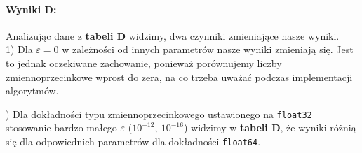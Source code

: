 \documentclass[12pt]{article}
\begin{document}
\paragraph{Wyniki D:}
Analizując dane z \textbf{tabeli D} widzimy, dwa czynniki zmieniające nasze wyniki. \\
1) Dla $\varepsilon = 0$ w zależności od innych parametrów nasze wyniki zmieniają się. Jest to jednak oczekiwane zachowanie, ponieważ porównujemy liczby zmiennoprzecinkowe wprost do zera, na co trzeba uważać podczas implementacji algorytmów.

\mbox{}) Dla dokładności typu zmiennoprzecinkowego ustawionego na \verb*|float32| stosowanie bardzo małego $\varepsilon$ ($10^{-12},\ 10^{-16}$) widzimy w \textbf{tabeli D}, że wyniki różnią się dla odpowiednich parametrów dla dokładności \verb*|float64|. 
\end{document}
